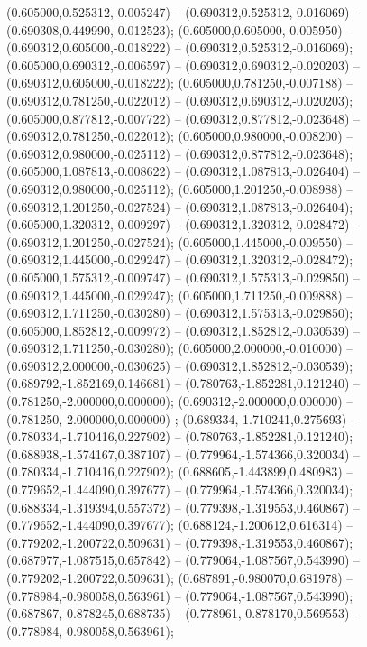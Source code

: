  (0.605000,0.525312,-0.005247) -- (0.690312,0.525312,-0.016069) -- (0.690308,0.449990,-0.012523);
 (0.605000,0.605000,-0.005950) -- (0.690312,0.605000,-0.018222) -- (0.690312,0.525312,-0.016069);
 (0.605000,0.690312,-0.006597) -- (0.690312,0.690312,-0.020203) -- (0.690312,0.605000,-0.018222);
 (0.605000,0.781250,-0.007188) -- (0.690312,0.781250,-0.022012) -- (0.690312,0.690312,-0.020203);
 (0.605000,0.877812,-0.007722) -- (0.690312,0.877812,-0.023648) -- (0.690312,0.781250,-0.022012);
 (0.605000,0.980000,-0.008200) -- (0.690312,0.980000,-0.025112) -- (0.690312,0.877812,-0.023648);
 (0.605000,1.087813,-0.008622) -- (0.690312,1.087813,-0.026404) -- (0.690312,0.980000,-0.025112);
 (0.605000,1.201250,-0.008988) -- (0.690312,1.201250,-0.027524) -- (0.690312,1.087813,-0.026404);
 (0.605000,1.320312,-0.009297) -- (0.690312,1.320312,-0.028472) -- (0.690312,1.201250,-0.027524);
 (0.605000,1.445000,-0.009550) -- (0.690312,1.445000,-0.029247) -- (0.690312,1.320312,-0.028472);
 (0.605000,1.575312,-0.009747) -- (0.690312,1.575313,-0.029850) -- (0.690312,1.445000,-0.029247);
 (0.605000,1.711250,-0.009888) -- (0.690312,1.711250,-0.030280) -- (0.690312,1.575313,-0.029850);
 (0.605000,1.852812,-0.009972) -- (0.690312,1.852812,-0.030539) -- (0.690312,1.711250,-0.030280);
 (0.605000,2.000000,-0.010000) -- (0.690312,2.000000,-0.030625) -- (0.690312,1.852812,-0.030539);
 (0.689792,-1.852169,0.146681) -- (0.780763,-1.852281,0.121240) -- (0.781250,-2.000000,0.000000);
 (0.690312,-2.000000,0.000000) -- (0.781250,-2.000000,0.000000) ;
 (0.689334,-1.710241,0.275693) -- (0.780334,-1.710416,0.227902) -- (0.780763,-1.852281,0.121240);
 (0.688938,-1.574167,0.387107) -- (0.779964,-1.574366,0.320034) -- (0.780334,-1.710416,0.227902);
 (0.688605,-1.443899,0.480983) -- (0.779652,-1.444090,0.397677) -- (0.779964,-1.574366,0.320034);
 (0.688334,-1.319394,0.557372) -- (0.779398,-1.319553,0.460867) -- (0.779652,-1.444090,0.397677);
 (0.688124,-1.200612,0.616314) -- (0.779202,-1.200722,0.509631) -- (0.779398,-1.319553,0.460867);
 (0.687977,-1.087515,0.657842) -- (0.779064,-1.087567,0.543990) -- (0.779202,-1.200722,0.509631);
 (0.687891,-0.980070,0.681978) -- (0.778984,-0.980058,0.563961) -- (0.779064,-1.087567,0.543990);
 (0.687867,-0.878245,0.688735) -- (0.778961,-0.878170,0.569553) -- (0.778984,-0.980058,0.563961);

